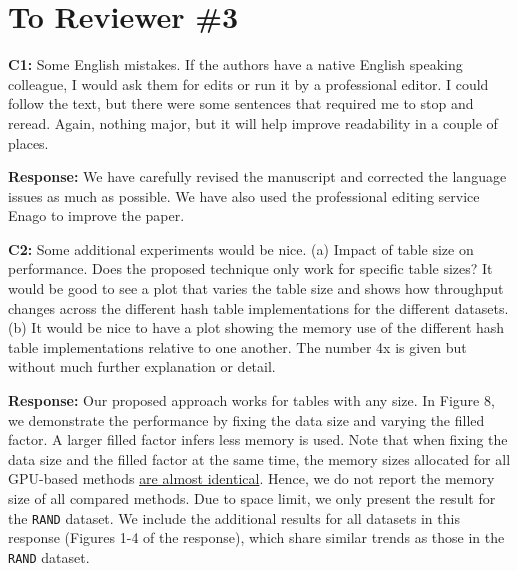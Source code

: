 \section*{To Reviewer \#3}

\begin{shaded}
	\noindent\textbf{C1:} Some English mistakes.  If the authors have a native English speaking colleague, I would ask them for edits or run it by a professional editor.  I could follow the text, but there were some sentences that required me to stop and reread.  Again, nothing major, but it will help improve readability in a couple of places.
\end{shaded}
%
\noindent\textbf{Response:} 
We have carefully revised the manuscript and corrected the language issues as much as possible. We have also used the professional editing service Enago to improve the paper. 

\begin{shaded}
	\noindent\textbf{C2:} Some additional experiments would be nice.
	(a) Impact of table size on performance.  Does the proposed technique only work for specific table sizes?  It would be good to see a plot that varies the table size and shows how throughput changes across the different hash table implementations for the different datasets.
	(b) It would be nice to have a plot showing the memory use of the different hash table implementations relative to one another.  The number 4x is given but without much further explanation or detail.
\end{shaded}
%
\noindent\textbf{Response:} 
Our proposed approach works for tables with any size. 
In Figure 8, we demonstrate the performance by fixing the data size and varying the filled factor. 
A larger filled factor infers less memory is used.
Note that when fixing the data size and the filled factor at the same time, the memory sizes allocated for all GPU-based methods \underline{are almost identical}. 
Hence, we do not report the memory size of all compared methods.  
Due to space limit, we only present the result for the {\tt RAND} dataset.
We include the additional results for all datasets in this response (Figures 1-4 of the response), which share similar trends as those in the {\tt RAND} dataset.

